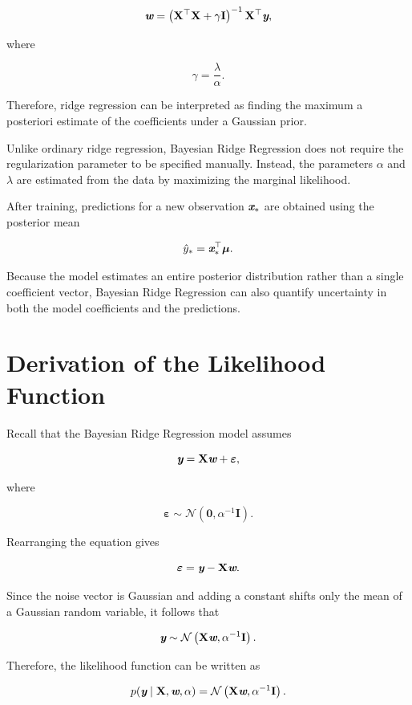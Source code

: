 \documentclass[14pt]{extarticle}
\def\mathbi#1{\textbf{\em #1}}
\begin{document}
\[
\mathbi{w}
=
\left(
\mathbf{X}^{\top}\mathbf{X}
+
\gamma\mathbf{I}
\right)^{-1}
\mathbf{X}^{\top}
\mathbi{y},
\]

where

\[
\gamma
=
\frac{\lambda}{\alpha}.
\]

Therefore, ridge regression can be interpreted as finding the maximum a posteriori estimate of the coefficients under a Gaussian prior.

Unlike ordinary ridge regression, Bayesian Ridge Regression does not require the regularization parameter to be specified manually. Instead, the parameters $\alpha$ and $\lambda$ are estimated from the data by maximizing the marginal likelihood.

After training, predictions for a new observation $\mathbi{x}_*$ are obtained using the posterior mean

\[
\hat{y}_*
=
\mathbi{x}_*^{\top}
\boldsymbol{\mu}.
\]

Because the model estimates an entire posterior distribution rather than a single coefficient vector, Bayesian Ridge Regression can also quantify uncertainty in both the model coefficients and the predictions.

\section*{Derivation of the Likelihood Function}

Recall that the Bayesian Ridge Regression model assumes

\[
\mathbi{y}
=
\mathbf{X}\mathbi{w}
+
\boldsymbol{\varepsilon},
\]

where

\[
\boldsymbol{\varepsilon}
\sim
\mathcal{N}
\left(
\mathbf{0},
\alpha^{-1}\mathbf{I}
\right).
\]

Rearranging the equation gives

\[
\boldsymbol{\varepsilon}
=
\mathbi{y}
-
\mathbf{X}\mathbi{w}.
\]

Since the noise vector is Gaussian and adding a constant shifts only the mean of a Gaussian random variable, it follows that

\[
\mathbi{y}
\sim
\mathcal{N}
\left(
\mathbf{X}\mathbi{w},
\alpha^{-1}\mathbf{I}
\right).
\]

Therefore, the likelihood function can be written as

\[
p(\mathbi{y}\mid\mathbf{X},\mathbi{w},\alpha)
=
\mathcal{N}
\left(
\mathbf{X}\mathbi{w},
\alpha^{-1}\mathbf{I}
\right).
\]
\end{document}
